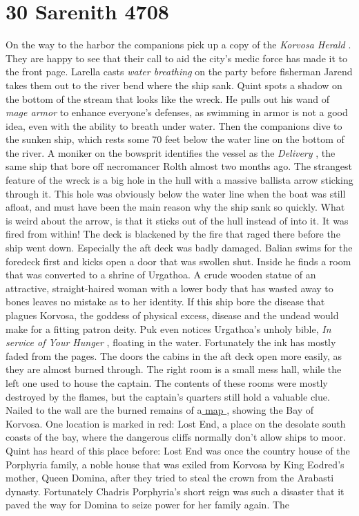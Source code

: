 \section{30 Sarenith 4708}

On the way to the harbor the companions pick up a copy of the {\itshape Korvosa Herald} . They are happy to see that their call to aid the city's medic force has made it to the front page. Larella casts {\itshape water breathing} on the party before fisherman Jarend takes them out to the river bend where the ship sank. Quint spots a shadow on the bottom of the stream that looks like the wreck. He pulls out his wand of  {\itshape mage armor} to enhance everyone's defenses, as swimming in armor is not a good idea, even with the ability to breath under water. Then the companions dive to the sunken ship, which rests some 70 feet below the water line on the bottom of the river. A moniker on the bowsprit identifies the vessel as the  {\itshape Delivery} , the same ship that bore off necromancer Rolth almost two months ago. The strangest feature of the wreck is a big hole in the hull with a massive ballista arrow sticking through it. This hole was obviously below the water line when the boat was still afloat, and must have been the main reason why the ship sank so quickly. What is weird about the arrow, is that it sticks out of the hull instead of into it. It was fired from within! The deck is blackened by the fire that raged there before the ship went down. Especially the aft deck was badly damaged. Balian swims for the foredeck first and kicks open a door that was swollen shut. Inside he finds a room that was converted to a shrine of Urgathoa. A crude wooden statue of an attractive, straight-haired woman with a lower body that has wasted away to bones leaves no mistake as to her identity. If this ship bore the disease that plagues Korvosa, the goddess of physical excess, disease and the undead would make for a fitting patron deity. Puk even notices Urgathoa's unholy bible, {\itshape In service of Your Hunger} , floating in the water. Fortunately the ink has mostly faded from the pages. The doors the cabins in the aft deck open more easily, as they are almost burned through. The right room is a small mess hall, while the left one used to house the captain. The contents of these rooms were mostly destroyed by the flames, but the captain's quarters still hold a valuable clue. Nailed to the wall are the burned remains of a\hyperref[fig:Burned-map-for-curse-of-the-Crimson-Throne-503803899]{ map } , showing the Bay of Korvosa. One location is marked in red: Lost End, a place on the desolate south coasts of the bay, where the dangerous cliffs normally don't allow ships to moor. Quint has heard of this place before: Lost End was once the country house of the Porphyria family, a noble house that was exiled from Korvosa by King Eodred's mother, Queen Domina, after they tried to steal the crown from the Arabasti dynasty. Fortunately Chadris Porphyria's short reign was such a disaster that it paved the way for Domina to seize power for her family again. The 